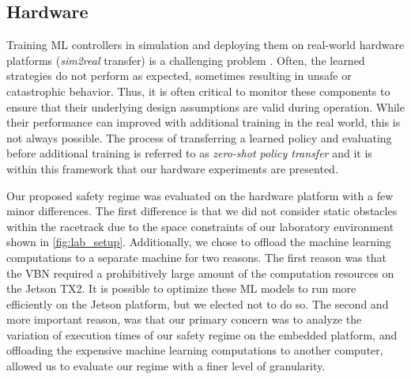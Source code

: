 \documentclass[manuscript,screen,review]{acmart}
\newcommand{\ttj}[1]{\textcolor{red}{\textbf{\underline{TTJ:}} #1}}
\begin{document}
\subsection{Hardware}
Training ML controllers in simulation and deploying them on real-world hardware platforms (\textit{sim2real} transfer) is a challenging problem \cite{jang2019ICCPS, kadian2019we}. Often, the learned strategies do not perform as expected, sometimes resulting in unsafe or catastrophic behavior. Thus, it is often critical to monitor these components to ensure that their underlying design assumptions are valid during operation. While their performance can improved with additional training in the real world, this is not always possible. The process of transferring a learned policy and evaluating before additional training is referred to as \emph{zero-shot policy transfer} and it is within this framework that our hardware experiments are presented.


Our proposed safety regime was evaluated on the hardware platform with a few minor differences. The first difference is that we did not consider static obstacles within the racetrack due to the space constraints of our laboratory environment shown in \ref{fig:lab_setup}. Additionally, we chose to offload the machine learning computations to a separate machine for two reasons. The first reason was that the VBN required a prohibitively large amount of the computation resources on the Jetson TX2. It is possible to optimize these ML models to run more efficiently on the Jetson platform, but we elected not to do so. The second and more important reason, was that our primary concern was to analyze the variation of execution times of our safety regime on the embedded platform, and offloading the expensive machine learning computations to another computer, allowed us to evaluate our regime with a finer level of granularity.
\end{document}
